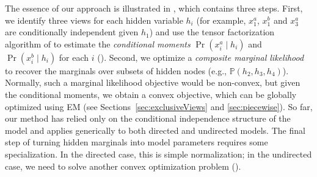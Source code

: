 The essence of our approach is illustrated in ,
which contains three steps.
First, we identify three views for each hidden variable $h_i$ (for example,
$x_1^a$, $x_1^b$ and $x_3^a$ are conditionally independent given $h_1$) and use
the tensor factorization algorithm of
\citet{anandkumar13tensor} to estimate the \emph{conditional
moments} $\Pr(x_i^a \mid h_i)$ and $\Pr(x_i^b \mid h_i)$ for each $i$ ().
Second, we optimize a \emph{composite marginal likelihood} to recover the marginals over
subsets of hidden nodes (e.g., $\mathbb P(h_2, h_3, h_4)$).
Normally, such a marginal likelihood objective would be non-convex,
but given the conditional moments, we obtain a convex objective,
which can be globally optimized using EM
(see Sections~\ref{sec:exclusiveViews} and \ref{sec:piecewise}).
So far, our method has relied only on the conditional independence
structure of the model and applies generically to both directed
and undirected models.
The final step of turning hidden marginals into model parameters
requires some specialization.
In the directed case, this is simple normalization;
in the undirected case, we need to solve another convex optimization problem
().
